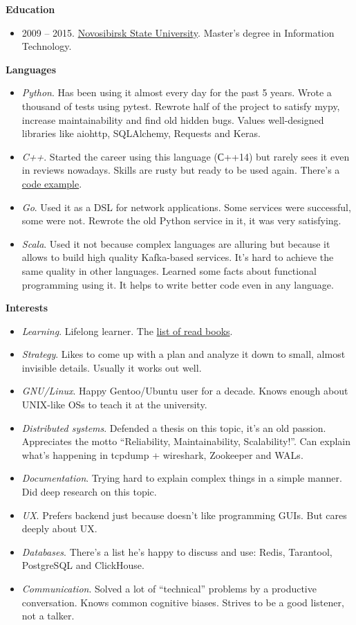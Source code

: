 \documentclass[final]{letter}
\begin{document}
{\bf Education}
\begin{itemize}
  \item 2009 -- 2015. \href{https://www.nsu.ru/n/}{Novosibirsk State University}. Master's degree in Information Technology.
\end{itemize}

{\bf Languages}
\begin{itemize}
\item \textit{Python}. Has been using it almost every day for the past 5 years.
  Wrote a thousand of tests using pytest. Rewrote half of the project to satisfy mypy, increase maintainability and find old hidden bugs.
  Values well-designed libraries like aiohttp, SQLAlchemy, Requests and Keras.
\item \textit{C++}. Started the career using this language (С++14) but rarely sees it even in reviews nowadays. Skills are rusty but ready to be used again.
  There's a \href{https://github.com/neexee/review}{code example}.
\item \textit{Go}. Used it as a DSL for network applications. Some services were successful, some were not.
   Rewrote the old Python service in it, it was very satisfying.
\item \textit{Scala}. Used it not because complex languages are alluring but because it allows to build high quality Kafka-based services. 
  It's hard to achieve the same quality in other languages.
  Learned some facts about functional programming using it. It helps to write better code even in any language.
\end{itemize}

{\bf Interests}
\begin{itemize}
  \item \textit{Learning}. Lifelong learner. The \href{https://www.goodreads.com/review/list/43338630-sergey-machulskis?shelf=professional}{list of read books}.
  \item \textit{Strategy}. Likes to come up with a plan and analyze it down to small, almost invisible details. Usually it works out well.
  \item \textit{GNU/Linux}. Happy Gentoo/Ubuntu user for a decade. Knows enough about UNIX-like OSs to teach it at the university.
  \item \textit{Distributed systems}. Defended a thesis on this topic, it's an old passion. Appreciates the motto ``Reliability, Maintainability, Scalability!''.
     Can explain what's happening in tcpdump + wireshark, Zookeeper and WALs.
  \item \textit{Documentation}. Trying hard to explain complex things in a simple manner. Did deep research on this topic.
  \item \textit{UX}. Prefers backend just because doesn't like programming GUIs. But cares deeply about UX.
  \item \textit{Databases}. There's a list he's happy to discuss and use: Redis, Tarantool, PostgreSQL and ClickHouse.
  \item \textit{Communication}. Solved a lot of ``technical'' problems by a productive conversation.
    Knows common cognitive biases. Strives to be a good listener, not a talker.
\end{itemize}
\end{document}
